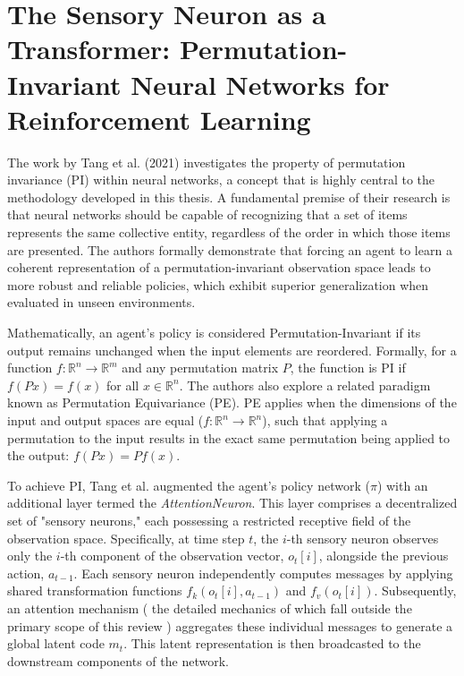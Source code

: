\documentclass[a4paper]{scrartcl}
\begin{document}
\section{The Sensory Neuron as a Transformer: Permutation-Invariant Neural Networks for Reinforcement Learning}

The work by Tang et al. (2021) \cite{DBLP:journals/corr/abs-2109-02869} investigates the property of permutation invariance (PI) within neural networks, a concept that is highly central to the methodology developed in this thesis. A fundamental premise of their research is that neural networks should be capable of recognizing that a set of items represents the same collective entity, regardless of the order in which those items are presented. The authors formally demonstrate that forcing an agent to learn a coherent representation of a permutation-invariant observation space leads to more robust and reliable policies, which exhibit superior generalization when evaluated in unseen environments.

Mathematically, an agent's policy is considered Permutation-Invariant if its output remains unchanged when the input elements are reordered. Formally, for a function $f: \mathbb{R}^n \rightarrow \mathbb{R}^m$ and any permutation matrix $P$, the function is PI if $f(Px) = f(x)$ for all $x \in \mathbb{R}^n$. The authors also explore a related paradigm known as Permutation Equivariance (PE). PE applies when the dimensions of the input and output spaces are equal ($f: \mathbb{R}^n \rightarrow \mathbb{R}^n$), such that applying a permutation to the input results in the exact same permutation being applied to the output: $f(Px) = P f(x)$.

To achieve PI, Tang et al. augmented the agent's policy network ($\pi$) with an additional layer termed the \textit{AttentionNeuron}. This layer comprises a decentralized set of "sensory neurons," each possessing a restricted receptive field of the observation space. Specifically, at time step $t$, the $i$-th sensory neuron observes only the $i$-th component of the observation vector, $o_t[i]$, alongside the previous action, $a_{t-1}$. Each sensory neuron independently computes messages by applying shared transformation functions $f_k(o_t[i], a_{t-1})$ and $f_v(o_t[i])$. Subsequently, an attention mechanism ( the detailed mechanics of which fall outside the primary scope of this review ) aggregates these individual messages to generate a global latent code $m_t$. This latent representation is then broadcasted to the downstream components of the network.
\end{document}
